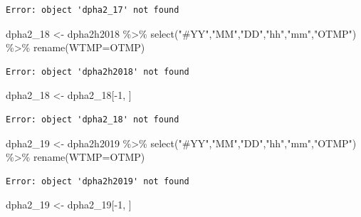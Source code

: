 \documentclass[
  letterpaper,
  DIV=11,
  numbers=noendperiod]{scrreprt}
\newenvironment{Shaded}{\begin{snugshade}}{\end{snugshade}}
\newcommand{\AttributeTok}[1]{\textcolor[rgb]{0.40,0.45,0.13}{#1}}
\newcommand{\DecValTok}[1]{\textcolor[rgb]{0.68,0.00,0.00}{#1}}
\newcommand{\FunctionTok}[1]{\textcolor[rgb]{0.28,0.35,0.67}{#1}}
\newcommand{\NormalTok}[1]{\textcolor[rgb]{0.00,0.23,0.31}{#1}}
\newcommand{\OtherTok}[1]{\textcolor[rgb]{0.00,0.23,0.31}{#1}}
\newcommand{\SpecialCharTok}[1]{\textcolor[rgb]{0.37,0.37,0.37}{#1}}
\newcommand{\StringTok}[1]{\textcolor[rgb]{0.13,0.47,0.30}{#1}}
\begin{document}
\begin{verbatim}
Error: object 'dpha2_17' not found
\end{verbatim}

\begin{Shaded}
\begin{Highlighting}[]
\NormalTok{dpha2\_18 }\OtherTok{\textless{}{-}}\NormalTok{ dpha2h2018 }\SpecialCharTok{\%\textgreater{}\%} \FunctionTok{select}\NormalTok{(}\StringTok{"\#YY"}\NormalTok{,}\StringTok{"MM"}\NormalTok{,}\StringTok{"DD"}\NormalTok{,}\StringTok{"hh"}\NormalTok{,}\StringTok{"mm"}\NormalTok{,}\StringTok{"OTMP"}\NormalTok{) }\SpecialCharTok{\%\textgreater{}\%}
  \FunctionTok{rename}\NormalTok{(}\AttributeTok{WTMP=}\NormalTok{OTMP)}
\end{Highlighting}
\end{Shaded}

\begin{verbatim}
Error: object 'dpha2h2018' not found
\end{verbatim}

\begin{Shaded}
\begin{Highlighting}[]
\NormalTok{dpha2\_18 }\OtherTok{\textless{}{-}}\NormalTok{ dpha2\_18[}\SpecialCharTok{{-}}\DecValTok{1}\NormalTok{, ]}
\end{Highlighting}
\end{Shaded}

\begin{verbatim}
Error: object 'dpha2_18' not found
\end{verbatim}

\begin{Shaded}
\begin{Highlighting}[]
\NormalTok{dpha2\_19 }\OtherTok{\textless{}{-}}\NormalTok{ dpha2h2019 }\SpecialCharTok{\%\textgreater{}\%} \FunctionTok{select}\NormalTok{(}\StringTok{"\#YY"}\NormalTok{,}\StringTok{"MM"}\NormalTok{,}\StringTok{"DD"}\NormalTok{,}\StringTok{"hh"}\NormalTok{,}\StringTok{"mm"}\NormalTok{,}\StringTok{"OTMP"}\NormalTok{) }\SpecialCharTok{\%\textgreater{}\%}
  \FunctionTok{rename}\NormalTok{(}\AttributeTok{WTMP=}\NormalTok{OTMP)}
\end{Highlighting}
\end{Shaded}

\begin{verbatim}
Error: object 'dpha2h2019' not found
\end{verbatim}

\begin{Shaded}
\begin{Highlighting}[]
\NormalTok{dpha2\_19 }\OtherTok{\textless{}{-}}\NormalTok{ dpha2\_19[}\SpecialCharTok{{-}}\DecValTok{1}\NormalTok{, ]}
\end{Highlighting}
\end{Shaded}
\end{document}
